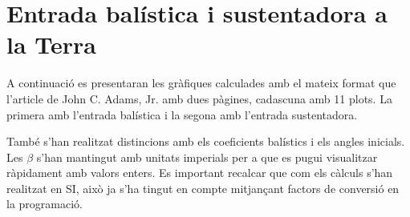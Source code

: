 
\appendix

\section{Entrada balística i sustentadora a la Terra}

A continuació es presentaran les gràfiques calculades amb el mateix format que l'article de John C. Adams, Jr. \cite{adams} amb dues pàgines, cadascuna amb 11 plots. La primera amb l'entrada balística i la segona amb l'entrada sustentadora.

També s'han realitzat distincions amb els coeficients balístics i els angles inicials. Les $\beta$ s'han mantingut amb unitats imperials per a que es pugui visualitzar ràpidament amb valors enters. Es important recalcar que com els càlculs s'han realitzat en SI, això ja s'ha tingut en compte mitjançant factors de conversió en la programació.

